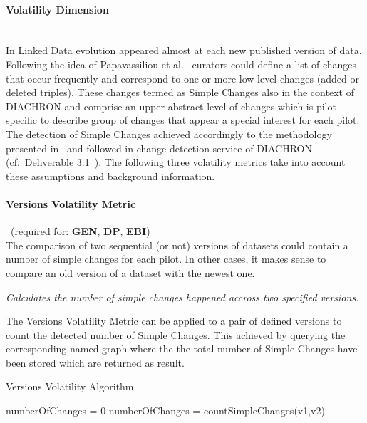 \paragraph{Volatility Dimension}~\\ %
In Linked Data evolution appeared almost at each new published version of data. Following the idea of Papavassiliou et al.~\cite{TODS13} curators could define a list of changes that occur frequently and correspond to one or more low-level changes (added or deleted triples). These changes termed as Simple Changes also in the context of DIACHRON and comprise an upper abstract level of changes which is pilot-specific to describe group of changes that appear a special interest for each pilot. The detection of Simple Changes achieved accordingly to the methodology presented in~\cite{TODS13} and followed in change detection service of DIACHRON (cf.\ Deliverable 3.1~\cite{diachron-d3.1}). The following three volatility metrics take into account these assumptions and background information.

\paragraph{Versions Volatility Metric}~(required for: \textbf{GEN}, \textbf{DP}, \textbf{EBI})~\\ %
The comparison of two sequential (or not) versions of datasets could contain a number of simple changes for each pilot. In other cases, it makes sense to compare an old version of a dataset with the newest one. 

\begin{mdframed}[style=metricdefinition]
\emph{Calculates the number of simple changes happened accross two specified versions.}
\end{mdframed}

The Versions Volatility Metric can be applied to a pair
of defined versions to count the detected number of Simple Changes. This achieved by querying the corresponding named graph where the the total number of Simple Changes have been stored which are returned as result. 

\begin{algorithm}
\caption{Versions Volatility Algorithm}
\begin{algorithmic}[1]
\State numberOfChanges = 0
\EndProcedure
{}
\State numberOfChanges = countSimpleChanges(v1,v2)
\EndProcedure
\State {}
\end{algorithmic}
\end{algorithm}


